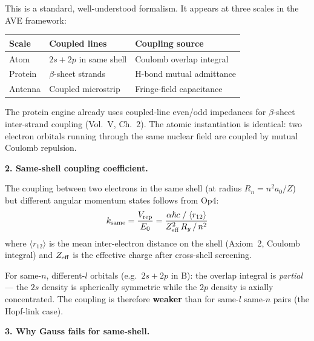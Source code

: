 This is a standard, well-understood formalism.
It appears at three scales in the AVE framework:
\begin{center}
\small
\renewcommand{\arraystretch}{1.2}
\begin{tabular}{l l l}
\toprule
\textbf{Scale} &
\textbf{Coupled lines} &
\textbf{Coupling source} \\
\midrule
Atom & $2s + 2p$ in same shell &
    Coulomb overlap integral \\
Protein & $\beta$-sheet strands &
    H-bond mutual admittance \\
Antenna & Coupled microstrip &
    Fringe-field capacitance \\
\bottomrule
\end{tabular}
\end{center}
The protein engine already uses coupled-line
even/odd impedances for $\beta$-sheet inter-strand
coupling (Vol.~V, Ch.~2).
The atomic instantiation is identical: two
electron orbitals running through the same
nuclear field are coupled by mutual Coulomb
repulsion.

\noindent\textbf{2. Same-shell coupling coefficient.}

The coupling between two electrons in the same
shell (at radius $R_n = n^2 a_0 / Z$) but different
angular momentum states follows from Op4:
\begin{equation}
    k_{\rm same} = \frac{V_{\rm rep}}{E_0}
    = \frac{\alpha\hbar c \; / \; \langle r_{12} \rangle}
           {Z_{\rm eff}^2 \, R_y \, / \, n^2}
    \label{eq:k_same_shell}
\end{equation}
where $\langle r_{12} \rangle$ is the mean
inter-electron distance on the shell
(Axiom~2, Coulomb integral) and $Z_{\rm eff}$
is the effective charge after cross-shell screening.

For same-$n$, different-$l$ orbitals (e.g.\
$2s + 2p$ in B): the overlap integral is
\emph{partial} --- the $2s$ density is spherically
symmetric while the $2p$ density is axially
concentrated.  The coupling is therefore
\textbf{weaker} than for same-$l$ same-$n$ pairs
(the Hopf-link case).

\noindent\textbf{3. Why Gauss fails for same-shell.}

